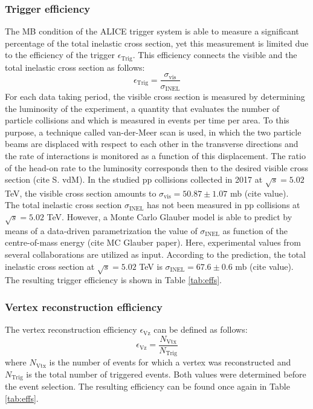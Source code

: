 \documentclass[12pt,a4paper]{report}
\begin{document}
\subsubsection{Trigger efficiency}
The MB condition of the ALICE trigger system is able to measure a significant percentage of the total inelastic cross section, yet this measurement is limited due to the efficiency of the trigger $\epsilon_\text{Trig}$. This efficiency connects the visible and the total inelastic cross section as follows:
\begin{equation}
\epsilon_\text{Trig}  =  \dfrac{\sigma_\text{vis}}{\sigma_\text{INEL}} 
\label{effTrig}
\end{equation}
For each data taking period, the visible cross section is measured by determining the luminosity of the experiment, a quantity that evaluates the number of particle collisions and which is measured in events per time per area. To this purpose, a technique called van-der-Meer scan is used, in which the two particle beams are displaced with respect to each other in the transverse directions and the rate of interactions is monitored as a function of this displacement. The ratio of the head-on rate to the luminosity corresponds then to the desired visible cross section (cite S. vdM). In the studied pp collisions collected in 2017 at $\sqrt{s} = 5.02$ TeV, the visible cross section amounts to $\sigma_\text{vis} = 50.87 \pm 1.07$ mb (cite value). \\
The total inelastic cross section $\sigma_\text{INEL}$ has not been measured in pp collisions at $\sqrt{s} = 5.02$ TeV. However, a Monte Carlo Glauber model is able to predict by means of a data-driven parametrization the value of $\sigma_\text{INEL}$ as function of the centre-of-mass energy 	(cite MC Glauber paper). Here, experimental values from several collaborations are utilized as input. According to the prediction, the total inelastic cross section at $\sqrt{s} = 5.02$ TeV is $\sigma_\text{INEL} = 67.6 \pm 0.6$ mb (cite value). The resulting trigger efficiency is shown in Table \ref{tab:effs}.
\subsubsection{Vertex reconstruction efficiency}
The vertex reconstruction efficiency $\epsilon_\text{Vz}$ can be defined as follows:
\begin{equation}
\epsilon_\text{Vz} = \dfrac{N_\text{Vtx}}{N_\text{Trig}} 
\end{equation}
where $N_\text{Vtx}$ is the number of events for which a vertex was reconstructed and $N_\text{Trig}$ is the total number of triggered events. Both values were determined before the event selection. The resulting efficiency can be found once again in Table \ref{tab:effs}.
\end{document}
